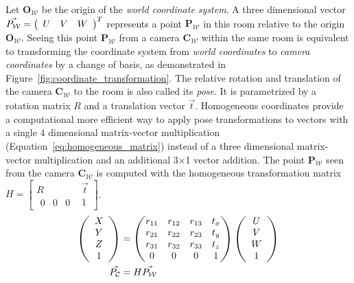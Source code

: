 Let $\mathbf{O_\mathcal{W}}$ be the origin of the \emph{world coordinate system}.
A three dimensional vector $\vec{P_\mathcal{W}} = \left(\begin{array}{ccc} U & V & W \end{array}\right)^T$ represents a point $\mathbf{P_\mathcal{W}}$ in this room relative to the origin $\mathbf{O_\mathcal{W}}$.
Seeing this point $\mathbf{P_\mathcal{W}}$ from a camera $\mathbf{C_\mathcal{W}}$ within the same room is equivalent to transforming the coordinate system from \emph{world coordinates} to \emph{camera coordinates} by a change of basis, as demonstrated in Figure~\ref{fig:coordinate_transformation}.
The relative rotation and translation of the camera $\mathbf{C_\mathcal{W}}$ to the room is also called its \emph{pose}\cite[p.15-39]{corke_2011}.
It is parametrized by a rotation matrix $R$ and a translation vector $\vec{t}$.
Homogeneous coordinates provide a computational more efficient way to apply pose transformations to vectors with a single 4 dimensional matrix-vector multiplication (Equation~\ref{eq:homogeneous_matrix}) instead of a three dimensional matrix-vector multiplication and an additional 3$\times$1 vector addition.
The point $\mathbf{P_\mathcal{W}}$ seen from the camera $\mathbf{C_\mathcal{W}}$ is computed with the homogeneous transformation matrix $H = \begin{bmatrix} R & \vec{t} \\ \begin{matrix}0 & 0 & 0\end{matrix} & 1 \end{bmatrix}$.
\begin{equation}
\begin{aligned}
    \left(\begin{array}{c} X \\ Y \\ Z \\ 1\end{array}\right)&= \begin{pmatrix}
        r_{11} & r_{12} & r_{13} & t_x \\
        r_{21} & r_{22} & r_{23} & t_y \\
        r_{31} & r_{32} & r_{33} & t_z \\
        0      & 0      & 0      & 1 \\
    \end{pmatrix} \left(\begin{array}{c} U \\ V \\ W \\ 1\end{array}\right) \\
    \vec{P_\mathcal{C}} &= H \vec{P_\mathcal{W}}
\end{aligned}
\label{eq:homogeneous_matrix}
\end{equation}

